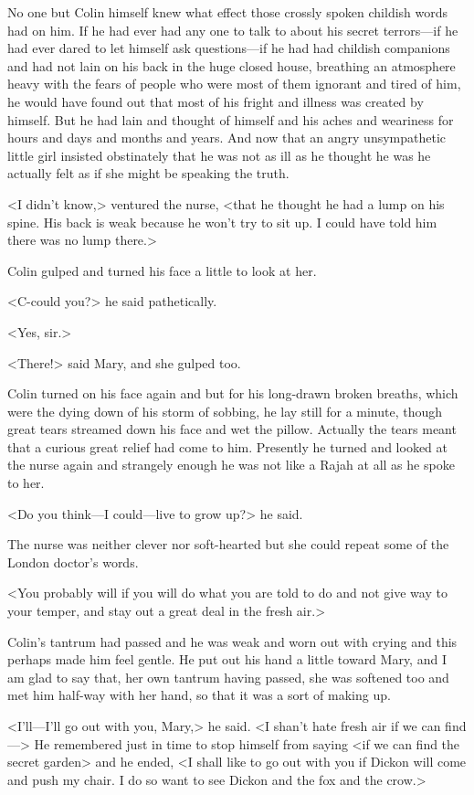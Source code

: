 No one but Colin himself knew what effect those crossly spoken childish words had on him. If he had ever had any one to talk to about his secret terrors—if he had ever dared to let himself ask questions—if he had had childish companions and had not lain on his back in the huge closed house, breathing an atmosphere heavy with the fears of people who were most of them ignorant and tired of him, he would have found out that most of his fright and illness was created by himself. But he had lain and thought of himself and his aches and weariness for hours and days and months and years. And now that an angry unsympathetic little girl insisted obstinately that he was not as ill as he thought he was he actually felt as if she might be speaking the truth.

<I didn't know,> ventured the nurse, <that he thought he had a lump on his spine. His back is weak because he won't try to sit up. I could have told him there was no lump there.>

Colin gulped and turned his face a little to look at her.

<C-could you?> he said pathetically.

<Yes, sir.>

<There!> said Mary, and she gulped too.

Colin turned on his face again and but for his long-drawn broken breaths, which were the dying down of his storm of sobbing, he lay still for a minute, though great tears streamed down his face and wet the pillow. Actually the tears meant that a curious great relief had come to him. Presently he turned and looked at the nurse again and strangely enough he was not like a Rajah at all as he spoke to her.

<Do you think—I could—live to grow up?> he said.

The nurse was neither clever nor soft-hearted but she could repeat some of the London doctor's words.

<You probably will if you will do what you are told to do and not give way to your temper, and stay out a great deal in the fresh air.>

Colin's tantrum had passed and he was weak and worn out with crying and this perhaps made him feel gentle. He put out his hand a little toward Mary, and I am glad to say that, her own tantrum having passed, she was softened too and met him half-way with her hand, so that it was a sort of making up.

<I'll—I'll go out with you, Mary,> he said. <I shan't hate fresh air if we can find—> He remembered just in time to stop himself from saying <if we can find the secret garden> and he ended, <I shall like to go out with you if Dickon will come and push my chair. I do so want to see Dickon and the fox and the crow.>

